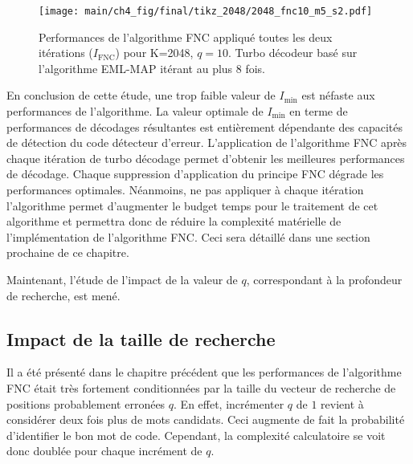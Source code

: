 \begin{figure}[!h]
	\centering
	\texttt{[image: main/ch4\_fig/final/tikz\_2048/2048\_fnc10\_m5\_s2.pdf]}
	\caption{Performances de l'algorithme FNC appliqué toutes les deux itérations ($I_\text{FNC}$) pour K=2048, $q=10$.
	Turbo décodeur basé sur l'algorithme EML-MAP itérant au plus 8 fois.
	\label{fig:fnc_2048_s2}}
\end{figure}

En conclusion de cette étude, une trop faible valeur de $I_\text{min}$ est néfaste aux performances de l'algorithme. 
La valeur optimale de $I_\text{min}$ en terme de performances de décodages résultantes est entièrement dépendante des
capacités de détection du code détecteur d'erreur. L'application de l'algorithme FNC après chaque itération de turbo 
décodage permet d'obtenir les meilleures performances de décodage. Chaque suppression d'application du principe FNC 
dégrade les performances optimales. Néanmoins, ne pas appliquer à chaque itération l'algorithme permet d'augmenter le 
budget temps pour le traitement de cet algorithme et permettra donc de réduire la complexité matérielle de 
l'implémentation de l'algorithme FNC. Ceci sera détaillé dans une section prochaine de ce chapitre.

Maintenant, l'étude de l'impact de la valeur de $q$, correspondant à la profondeur de recherche, est mené.

\subsection{Impact de la taille de recherche}
Il a été présenté dans le chapitre précédent que les performances de l'algorithme FNC était très fortement conditionnées
par la taille du vecteur de recherche de positions probablement erronées $q$. En effet, incrémenter $q$ de $1$ revient 
à considérer deux fois plus de mots candidats. Ceci augmente de fait la probabilité d'identifier le bon mot de code. 
Cependant, la complexité calculatoire se voit donc doublée pour chaque incrément de $q$. 

